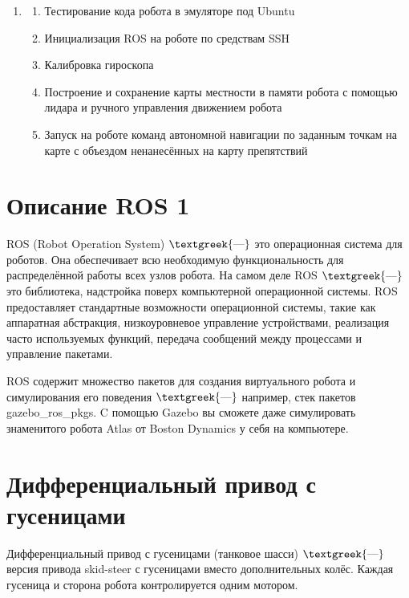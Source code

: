 \documentclass[a4paper]{article}
\begin{document}
\begin{enumerate}[series=listWWNumxxiii,label=\arabic*),ref=\arabic*]
\begin{enumerate}[resume*=listWWNumxxiii,start=1]
\item \begin{enumerate}[resume*=listWWNumxxiii,start=1]
\item Тестирование кода робота в эмуляторе под Ubuntu
\item Инициализация ROS на роботе по средствам SSH
\item Калибровка гироскопа
\item Построение и сохранение карты местности в памяти робота с помощью лидара и ручного управления движением робота
\item Запуск на роботе команд автономной навигации по заданным точкам на карте с объездом ненанесённых на карту
препятствий
\end{enumerate}
\end{enumerate}
\end{enumerate}

\bigskip

\section[Описание ROS 1]{Описание \foreignlanguage{english}{ROS} 1}
ROS (Robot Operation System) $\text{\textgreek{—}}$ это операционная система для роботов. Она обеспечивает всю
необходимую функциональность для распределённой работы всех узлов робота. На самом деле ROS $\text{\textgreek{—}}$ это
библиотека, надстройка поверх компьютерной операционной системы. ROS предоставляет стандартные возможности операционной
системы, такие как аппаратная абстракция, низкоуровневое управление устройствами, реализация часто используемых
функций, передача сообщений между процессами и управление пакетами.

ROS содержит множество пакетов для создания виртуального робота и симулирования его поведения $\text{\textgreek{—}}$
например, стек пакетов gazebo\_ros\_pkgs. C помощью Gazebo вы сможете даже симулировать знаменитого робота Atlas от
Boston Dynamics у себя на компьютере.

\section{Дифференциальный привод с гусеницами}
Дифференциальный привод с гусеницами (танковое шасси) $\text{\textgreek{—}}$ версия привода skid-steer с гусеницами
вместо дополнительных колёс. Каждая гусеница и сторона робота контролируется одним мотором.
\end{document}
